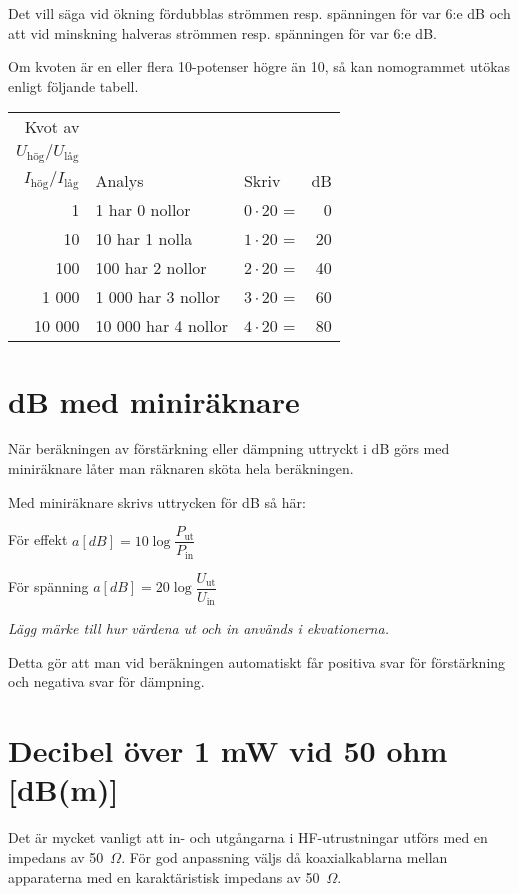 Det vill säga vid ökning fördubblas strömmen resp. spänningen för var 6:e dB
och att vid minskning halveras strömmen resp. spänningen för var 6:e dB.

Om kvoten är en eller flera 10-potenser högre än 10, så kan nomogrammet utökas
enligt följande tabell.

\begin{center}
\begin{tabular}{rllr}
  Kvot av & & & \\
\(U_\text{hög}/U_\text{låg}\) &          &                  &    \\
\(I_\text{hög}/I_\text{låg}\) & Analys             & Skriv            & dB \\
  \hline
     1 & 1 har 0 nollor      & \(0 \cdot 20\) = &  0 \\
    10 & 10 har 1 nolla      & \(1 \cdot 20\) = & 20 \\
   100 & 100 har 2 nollor    & \(2 \cdot 20\) = & 40 \\
 1 000 &  1 000 har 3 nollor & \(3 \cdot 20\) = & 60 \\
10 000 & 10 000 har 4 nollor & \(4 \cdot 20\) = & 80
\end{tabular}
\end{center}

\section{dB med miniräknare}

När beräkningen av förstärkning eller dämpning uttryckt i dB görs med
miniräknare låter man räknaren sköta hela beräkningen.

Med miniräknare skrivs uttrycken för dB så här:

För effekt \(a[dB] = 10\log \dfrac{P_\text{ut}}{P_\text{in}}\)

För spänning \(a[dB] = 20\log \dfrac{U_\text{ut}}{U_\text{in}}\)

\emph{Lägg märke till hur värdena ut och in används i ekvationerna.}

Detta gör att man vid beräkningen automatiskt får positiva svar för
förstärkning och negativa svar för dämpning.

\section{Decibel över 1 mW vid 50 ohm [dB(m)]}

Det är mycket vanligt att in- och utgångarna i HF-utrustningar utförs
med en impedans av 50~\(\Omega\).
För god anpassning väljs då koaxialkablarna mellan apparaterna med en
karaktäristisk impedans av 50~\(\Omega\).

